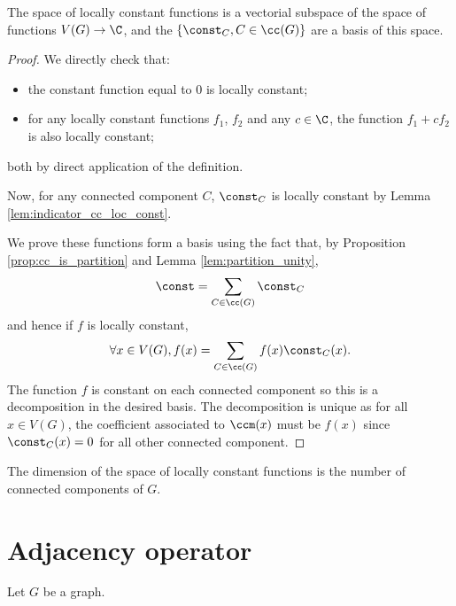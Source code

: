 \begin{lemma}
  \label{thm:locally_constant_basis}
  The space of locally constant functions is a vectorial subspace of
  the space of functions $V(G) \rightarrow \C$, and the $\{\const_C, C \in \cc(G)\}$
  are a basis of this space.
\end{lemma}

\begin{proof}
  We directly check that:
  \begin{itemize}
    \item the constant function equal to $0$ is locally constant;
    \item for any locally constant functions $f_1$, $f_2$ and any $c \in \C$,
    the function $f_1+cf_2$ is also locally constant;
  \end{itemize}
  both by direct application of the definition.

  Now, for any connected component $C$, $\const_C$ is locally
  constant by Lemma \ref{lem:indicator_cc_loc_const}.

  We prove these functions form a basis using the fact that, by
  Proposition \ref{prop:cc_is_partition} and Lemma \ref{lem:partition_unity},
  \begin{equation*}
    \const = \sum_{C \in \cc(G)} \const_C
  \end{equation*}
  and hence if $f$ is locally constant,
    \begin{equation*}
      \forall x \in V(G),
    f(x) = \sum_{C \in \cc(G)} f(x) \const_C(x).
  \end{equation*}
  The function $f$ is constant on each connected component so this is a decomposition
  in the desired basis. The decomposition is unique as for all $x \in V(G)$, the coefficient
  associated to $\ccm(x)$ must be $f(x)$ since $\const_C(x)=0$ for all other connected component.
\end{proof}

\begin{corollary}
  \label{cor:dimension_locally_constant}
  The dimension of the space of locally constant functions is the number of
  connected components of $G$.
\end{corollary}

\section{Adjacency operator}

Let $G$ be a graph.

